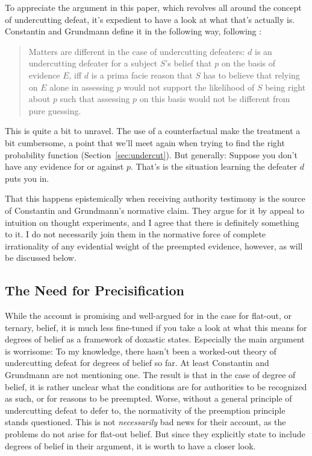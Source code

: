 \documentclass[11pt, a4paper]{scrartcl}
\renewcommand{\i}[1]{\emph{#1}}
\begin{document}
To appreciate the argument in this paper, which revolves all around the concept of undercutting defeat, it's expedient to have a look at what that's actually is. Constantin and Grundmann define it in the following way, following \textcite{Pollock1976-POLKAJ-4}:
\begin{quote}

Matters are different in the case of undercutting defeaters: $d$ is an  undercutting defeater for a subject $S$’s belief that $p$ on the basis of evidence $E$, iff $d$ is a prima facie reason that $S$ has to believe that relying on $E$ alone in assessing $p$ would not support the likelihood of $S$ being right about $p$ such that assessing $p$ on this basis would not be different from pure guessing. 

\end{quote}

This is quite a bit to unravel. The use of a counterfactual make the treatment a bit cumbersome, a point that we'll meet again when trying to find the right probability function (Section~\ref{sec:undercut}). But generally: Suppose you don't have any evidence for or against $p$. That's is the situation learning the defeater $d$ puts you in. 

That this happens epistemically when receiving authority testimony is the source of Constantin and Grundmann's normative claim. They argue for it by appeal to intuition on thought experiments, and I agree that there is definitely something to it. I do not necessarily join them in the normative force of complete irrationality of any evidential weight of the preempted evidence, however, as will be discussed below.

\subsection{The Need for Precisification}

While the account is promising and well-argued for in the case for flat-out, or ternary, belief, it is much less fine-tuned if you take a look at what this means for degrees of belief as a framework of doxastic states. Especially the main argument is worrisome: To my knowledge, there hasn't been a worked-out theory of undercutting defeat for degrees of belief so far. At least Constantin and Grundmann are not mentioning one. The result is that in the case of degree of belief, it is rather unclear what the conditions are for authorities to be recognized as such, or for reasons to be preempted. Worse, without a general principle of undercutting defeat to defer to, the normativity of the preemption principle stands questioned. This is not \i{necessarily} bad news for their account, as the problems do not arise for flat-out belief. But since they explicitly state to include degrees of belief in their argument, it is worth to have a closer look.  
\end{document}
